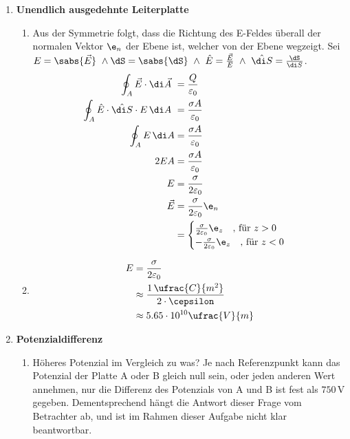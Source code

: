 \documentclass[11pt,letterpaper]{article}
\begin{document}
\begin{enumerate}
    
    \item \textbf{Unendlich ausgedehnte Leiterplatte}
        \begin{enumerate}
            \item
            Aus der Symmetrie folgt, dass die Richtung des E-Feldes überall 
            der normalen Vektor $\e_n$ der Ebene ist, welcher von der Ebene wegzeigt.
            Sei $E=\sabs{\vec{E}}\ \land \dS=\sabs{\dS} \ \land \ \hat{E}= \frac{\vec{E}}{E}  \ \land \ \hat{\di S}= \frac{\dS}{\di S}$.
            \begin{align*}
                \oint_A \vec{E} \cdot \di \vec{A}\ &=\frac{Q}{\varepsilon_0}\\
                \oint_A \hat{E}\cdot \hat{\di S} \cdot E \,\di A\ &=\frac{\sigma A}{\varepsilon_0}\\
                \oint_A E \, \di A &= \frac{\sigma A}{\varepsilon_0}\\
                2 E A &=\frac{\sigma A}{\varepsilon_0}\\
                E &=\frac{\sigma }{2 \varepsilon_0}\\
                \vec{E} &= \frac{\sigma }{2 \varepsilon_0}\e_n\\
                &= \begin{cases}
                    \frac{\sigma }{2 \varepsilon_0} \e_z \quad \text{, für }z>0\\
                    -\frac{\sigma }{2 \varepsilon_0} \e_z \quad \text{, für }z<0
                \end{cases}
            \end{align*}

            \item
            \begin{align*}
                E &= \frac{\sigma }{2 \varepsilon_0}\\
                &\approx \frac{1\,\ufrac{C}{m^2}}{2\cdot \cepsilon}\\
                &\approx 5.65\cdot 10^{10} \ufrac{V}{m}
            \end{align*}

        \end{enumerate}

    
    \item \textbf{Potenzialdifferenz}
        \begin{enumerate}
            \item
            Höheres Potenzial im Vergleich zu was? Je nach Referenzpunkt 
            kann das Potenzial der Platte A oder B gleich null sein, oder jeden anderen 
            Wert annehmen, nur die Differenz des Potenzials von A und B ist fest als 
            $750 \,\mathrm{V}$ gegeben. Dementsprechend hängt die Antwort dieser
            Frage vom Betrachter ab, und ist im Rahmen dieser Aufgabe nicht klar beantwortbar.


\end{enumerate}
\end{enumerate}
\end{document}
